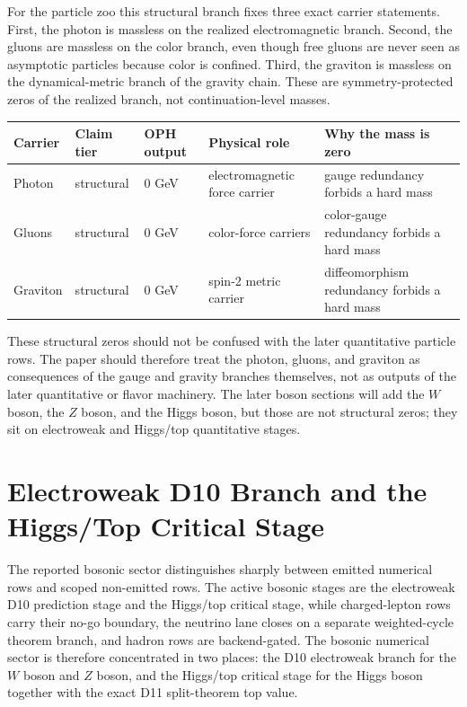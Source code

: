 \documentclass[11pt]{article}
\begin{document}
For the particle zoo this structural branch fixes three exact carrier statements.
First, the photon is massless on the realized electromagnetic branch. Second, the gluons are
massless on the color branch, even though free gluons are never seen as asymptotic particles
because color is confined. Third, the graviton is massless on the dynamical-metric branch of the
gravity chain. These are symmetry-protected zeros of the realized branch, not continuation-level
masses.

\begin{table}[h]
\centering
\small
\begin{tabular}{@{}>{\raggedright\arraybackslash}p{}>{\raggedright\arraybackslash}p{}>{\raggedright\arraybackslash}p{}>{\raggedright\arraybackslash}p{}>{\raggedright\arraybackslash}p{}@{}}
\toprule
Carrier & Claim tier & OPH output & Physical role & Why the mass is zero \\
\midrule
Photon & structural & \(0\) GeV & electromagnetic force carrier & gauge redundancy forbids a hard mass \\
Gluons & structural & \(0\) GeV & color-force carriers & color-gauge redundancy forbids a hard mass \\
Graviton & structural & \(0\) GeV & spin-2 metric carrier & diffeomorphism redundancy forbids a hard mass \\
\bottomrule
\end{tabular}
\end{table}

These structural zeros should not be confused with the later quantitative particle rows. The
paper should therefore treat the photon, gluons, and graviton as consequences of the
gauge and gravity branches themselves, not as outputs of the later quantitative or flavor
machinery. The later boson sections will add the \(W\) boson, the \(Z\) boson, and the Higgs
boson, but those are not structural zeros; they sit on electroweak and Higgs/top quantitative stages.

\section{Electroweak D10 Branch and the Higgs/Top Critical Stage}

The reported bosonic sector distinguishes sharply between emitted numerical rows and scoped
non-emitted rows. The active bosonic stages are the electroweak
D10 prediction stage and the Higgs/top critical stage, while charged-lepton rows
carry their no-go boundary, the neutrino lane closes on a separate weighted-cycle theorem branch, and hadron rows are backend-gated. The bosonic numerical
sector is therefore concentrated in two places: the D10 electroweak branch for the \(W\) boson and \(Z\) boson, and
the Higgs/top critical stage for the Higgs boson together with the exact D11 split-theorem top value.
\end{document}
